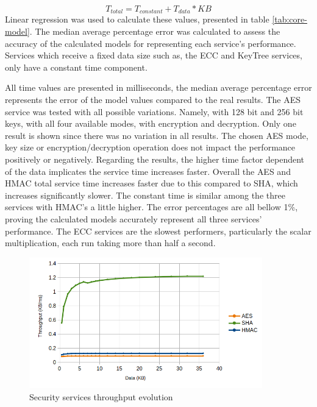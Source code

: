 \begin{equation}
	\label{eq:linear-eq}
	T_{total} = T_{constant} + T_{data} * KB
\end{equation}
Linear regression was used to calculate these values, presented in table \ref{tab:core-model}. The median average percentage error was calculated to assess the accuracy of the calculated models for representing each service's performance. Services which receive a fixed data size such as, the \ac{ECC} and KeyTree services, only have a constant time component.



All time values are presented in milliseconds, the median average percentage error represents the error of the model values compared to the real results.
The \ac{AES} service was tested with all possible variations. Namely, with 128 bit and 256 bit keys, with all four available modes, with encryption and decryption. Only one result is shown since there was no variation in all results. The chosen \ac{AES} mode, key size or encryption/decryption operation does not impact the performance positively or negatively.
Regarding the results, the higher time factor dependent of the data implicates the service time increases faster. Overall the \ac{AES} and \ac{HMAC} total service time increases faster due to this compared to \ac{SHA}, which increases significantly slower. The constant time is similar among the three services with \ac{HMAC}'s a little higher.
The error percentages are all bellow 1\%, proving the calculated models accurately represent all three services' performance.
The \ac{ECC} services are the slowest performers, particularly the scalar multiplication, each run taking more than half a second.

\begin{figure}[h!]
	\centering
	\includegraphics[width=0.9\textwidth]{./Images/core-tput.png}
	\caption{Security services throughput evolution}
	\label{fig:performance:core-tput}
\end{figure}


